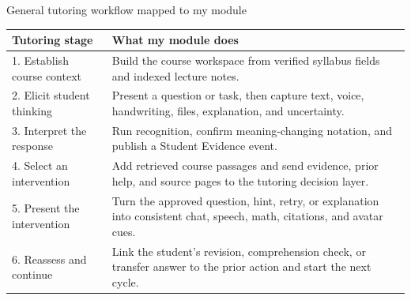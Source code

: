 \documentclass[aspectratio=169,10pt]{beamer}
\begin{document}
\begin{frame}{General tutoring workflow mapped to my module}
\small
\begin{tabularx}{\textwidth}{@{}p{}X@{}}
\toprule
\textbf{Tutoring stage} & \textbf{What my module does} \\
\midrule
1. Establish course context & Build the course workspace from verified syllabus fields and indexed lecture notes. \\
2. Elicit student thinking & Present a question or task, then capture text, voice, handwriting, files, explanation, and uncertainty. \\
3. Interpret the response & Run recognition, confirm meaning-changing notation, and publish a Student Evidence event. \\
4. Select an intervention & Add retrieved course passages and send evidence, prior help, and source pages to the tutoring decision layer. \\
5. Present the intervention & Turn the approved question, hint, retry, or explanation into consistent chat, speech, math, citations, and avatar cues. \\
6. Reassess and continue & Link the student's revision, comprehension check, or transfer answer to the prior action and start the next cycle. \\
\bottomrule
\end{tabularx}
\vspace{.45em}
\centering
{}
\end{frame}
\end{document}

